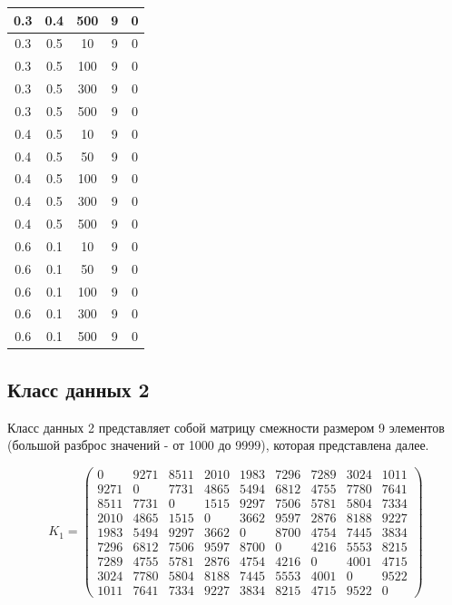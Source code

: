 \begin{center}
\begin{longtable}[c]{|c|c|c|c|c|}
		0.3 & 0.4 & 500 &    9 &    0 \\ \hline
		0.3 & 0.5 &  10 &    9 &    0 \\
		0.3 & 0.5 & 100 &    9 &    0 \\
		0.3 & 0.5 & 300 &    9 &    0 \\
		0.3 & 0.5 & 500 &    9 &    0 \\ \hline
		0.4 & 0.5 &  10 &    9 &    0 \\
		0.4 & 0.5 &  50 &    9 &    0 \\
		0.4 & 0.5 & 100 &    9 &    0 \\
		0.4 & 0.5 & 300 &    9 &    0 \\
		0.4 & 0.5 & 500 &    9 &    0 \\ \hline
		0.6 & 0.1 &  10 &    9 &    0 \\
		0.6 & 0.1 &  50 &    9 &    0 \\
		0.6 & 0.1 & 100 &    9 &    0 \\
		0.6 & 0.1 & 300 &    9 &    0 \\
		0.6 & 0.1 & 500 &    9 &    0 \\ \hline
	\end{longtable}
\end{center}


\subsection{Класс данных 2}\label{par:class2}


Класс данных 2 представляет собой матрицу смежности размером 9 элементов (большой разброс значений - от 1000 до 9999), которая представлена далее.

\begin{equation}
	\label{eq:kd2}
	K_{1} = \begin{pmatrix}
		0 & 9271 & 8511 & 2010 & 1983 & 7296 & 7289 & 3024 & 1011 \\
		9271 & 0 & 7731 & 4865 & 5494 & 6812 & 4755 & 7780 & 7641 \\
		8511 & 7731 & 0 & 1515 & 9297 & 7506 & 5781 & 5804 & 7334 \\
		2010 & 4865 & 1515 & 0 & 3662 & 9597 & 2876 & 8188 & 9227 \\
		1983 & 5494 & 9297 & 3662 & 0 & 8700 & 4754 & 7445 & 3834 \\
		7296 & 6812 & 7506 & 9597 & 8700 & 0 & 4216 & 5553 & 8215 \\
		7289 & 4755 & 5781 & 2876 & 4754 & 4216 & 0 & 4001 & 4715 \\
		3024 & 7780 & 5804 & 8188 & 7445 & 5553 & 4001 & 0 & 9522 \\
		1011 & 7641 & 7334 & 9227 & 3834 & 8215 & 4715 & 9522 & 0 
	\end{pmatrix}
\end{equation}


